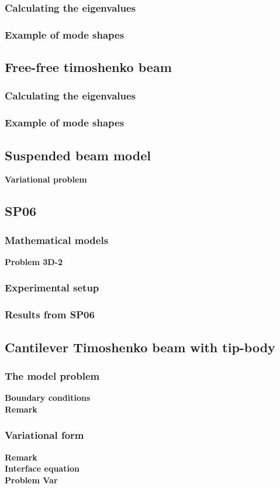 \documentclass[../main.tex]{subfiles}
\begin{document}
\subsubsection{Calculating the eigenvalues}
\subsubsection{Example of mode shapes}
\subsection{Free-free timoshenko beam}
\subsubsection{Calculating the eigenvalues}
\subsubsection{Example of mode shapes}
\subsection{Suspended beam model}
\textbf{Variational problem}
\subsection{SP06}
\subsubsection{Mathematical models}
\textbf{Problem 3D-2}
\subsubsection{Experimental setup}
\subsubsection{Results from SP06}
\subsection{Cantilever Timoshenko beam with tip-body}
\subsubsection{The model problem}
\textbf{Boundary conditions}\\
\textbf{Remark}
\subsubsection{Variational form}
\textbf{Remark}\\
\textbf{Interface equation}\\
\textbf{Problem Var}
\end{document}
